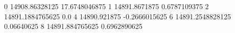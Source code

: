 0 14908.86328125 17.6748046875
1 14891.8671875 0.6787109375
2 14891.1884765625 0.0
4 14890.921875 -0.2666015625
6 14891.2548828125 0.06640625
8 14891.884765625 0.6962890625
